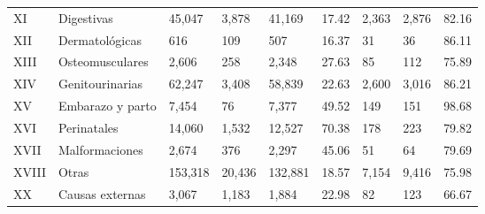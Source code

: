 \begin{tabular}{lllllllll}
XI                     & Digestivas       & 45,047       & 3,878              & 41,169             & 17.42             & 2,363                   & 2,876  & 82.16       \\
XII                    & Dermatológicas   & 616          & 109                & 507                & 16.37             & 31                      & 36     & 86.11       \\
XIII                   & Osteomusculares  & 2,606        & 258                & 2,348              & 27.63             & 85                      & 112    & 75.89       \\
XIV                    & Genitourinarias  & 62,247       & 3,408              & 58,839             & 22.63             & 2,600                   & 3,016  & 86.21       \\
XV                     & Embarazo y parto & 7,454        & 76                 & 7,377              & 49.52             & 149                     & 151    & 98.68       \\
XVI                    & Perinatales      & 14,060       & 1,532              & 12,527             & 70.38             & 178                     & 223    & 79.82       \\
XVII                   & Malformaciones   & 2,674        & 376                & 2,297              & 45.06             & 51                      & 64     & 79.69       \\
XVIII                  & Otras            & 153,318      & 20,436             & 132,881            & 18.57             & 7,154                   & 9,416  & 75.98       \\
XX                     & Causas externas  & 3,067        & 1,183              & 1,884              & 22.98             & 82                      & 123    & 66.67 \\
\bottomrule
\end{tabular}
